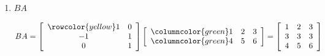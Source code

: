 \documentclass[../../Main.tex]{subfiles}
\begin{document}
\begin{example}
\begin{enumerate}
{            \begin{solution}
                \[
                AB =
                \left[
                    \begin{array}{ccc}
                        \rowcolor{yellow} 1 & 2 & 3 \\
                        4 & 5 & 6 \\
                    \end{array}
                \right]
                \left[
                    \begin{array}{>{\columncolor{green}}c ccc}
                        1 & 0 \\
                        -1 & 1 \\
                        0 & 1 \\
                    \end{array}
                \right]
                =
                \left[
                    \begin{array}{cc}
                        -1 & 5 \\
                        -1 & 11 \\
                    \end{array}
                \right]
                \]
            \end{solution}
        }

        \item
        {
            $BA$

            \begin{solution}
                \[
                BA =
                \left[
                    \begin{array}{cc}
                        \rowcolor{yellow} 1 & 0 \\
                        -1 & 1 \\
                        0 & 1 \\
                    \end{array}
                \right]
                \left[
                    \begin{array}{>{\columncolor{green}}c cc}
                        1 & 2 & 3 \\
                        4 & 5 & 6 \\
                    \end{array}
                \right]
                =
                \left[
                    \begin{array}{ccc}
                        1 & 2 & 3 \\
                        3 & 3 & 3 \\
                        4 & 5 & 6 \\
                    \end{array}
                \right]
                \]
            \end{solution} 
        }


\end{enumerate}
\end{example}
\end{document}
